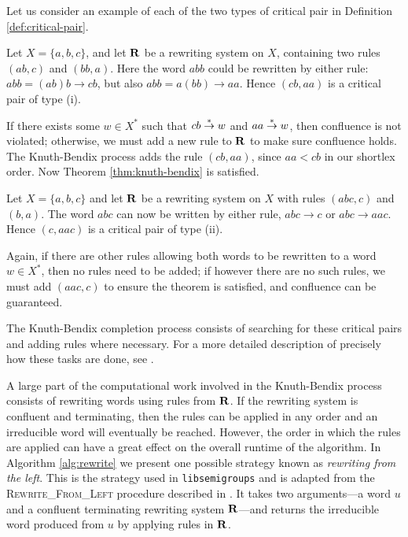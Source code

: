 Let us consider an example of each of the two types of critical pair in
Definition \ref{def:critical-pair}.

\begin{example}
  Let $X=\{a,b,c\}$, and let $\mathbf{R}$ be a rewriting system on $X$, containing
  two rules $(ab, c)$ and $(bb, a)$.  Here the word $abb$ could be
  rewritten by either rule: $abb = (ab)b \to cb$, but also
  $abb = a(bb) \to aa$.  Hence $(cb, aa)$ is a critical pair of type (i).

  If there exists some $w \in X^*$ such that $cb \stackrel{*}{\to} w$ and $aa \stackrel{*}{\to} w$,
  then confluence is not violated; otherwise, we must add a new rule to $\mathbf{R}$
  to make sure confluence holds.  The Knuth-Bendix process adds the rule
  $(cb, aa)$, since $aa < cb$ in our shortlex order.  Now Theorem
  \ref{thm:knuth-bendix} is satisfied.
\end{example}

\begin{example}
  Let $X=\{a,b,c\}$ and let $\mathbf{R}$ be a rewriting system on $X$ with rules
  $(abc, c)$ and $(b, a)$.  The word $abc$ can now be written by either rule,
  $abc \to c$ or $abc \to aac$.  Hence $(c, aac)$ is a critical pair of type
  (ii).

  Again, if there are other rules allowing both words to be rewritten to a word
  $w \in X^*$, then no rules need to be added; if however there are no such
  rules, we must add $(aac, c)$ to ensure the theorem is satisfied, and
  confluence can be guaranteed.
\end{example}

The Knuth-Bendix completion process consists of searching for these critical
pairs and adding rules where necessary.  For a more detailed description of
precisely how these tasks are done, see \cite[\S 2.6]{sims}.

A large part of the computational work involved in the Knuth-Bendix process
consists of rewriting words using rules from $\mathbf{R}$.  If the rewriting system is
confluent and terminating, then the rules can be applied in any order and an
irreducible word will eventually be reached.  However, the order in which the
rules are applied can have a great effect on the overall runtime of the
algorithm.  In Algorithm \ref{alg:rewrite} we present one possible strategy
known as \textit{rewriting from the left}.  This is the strategy used in
\texttt{libsemigroups} \cite{libsemigroups} and is adapted from the
\textsc{Rewrite\_From\_Left} procedure described in \cite[\S 2.4]{sims}.  It
takes two arguments---a word $u$ and a confluent terminating rewriting system
$\mathbf{R}$---and returns the irreducible word produced from $u$ by applying rules in
$\mathbf{R}$.

